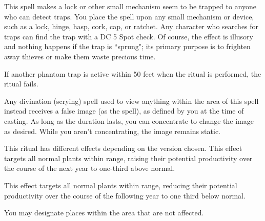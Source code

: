 \begin{spelleffect}
This spell makes a lock or other small mechanism seem to be trapped to anyone who can detect traps. You place the spell upon any small mechanism or device, such as a lock, hinge, hasp, cork, cap, or ratchet. Any character who searches for traps can find the trap with a DC 5 Spot check. Of course, the effect is illusory and nothing happens if the trap is ``sprung"; its primary purpose is to frighten away thieves or make them waste precious time.
\par If another phantom trap is active within 50 feet when the ritual is performed, the ritual fails.
\end{spelleffect}

\begin{spelleffect}
Any divination (scrying) spell used to view anything within the area of this spell instead receives a false image (as the  spell), as defined by you at the time of casting. As long as the duration lasts, you can concentrate to change the image as desired. While you aren't concentrating, the image remains static.
\end{spelleffect}

\begin{spelleffect}
This ritual has different effects depending on the version chosen.
 This effect targets all normal plants within range, raising their potential productivity over the course of the next year to one-third above normal.
\par {} This effect targets all normal plants within range, reducing their potential productivity over the course of the following year to one third below normal.
\end{spelleffect}
\begin{spellnotes}
You may designate places within the area that are not affected.
\end{spellnotes}

